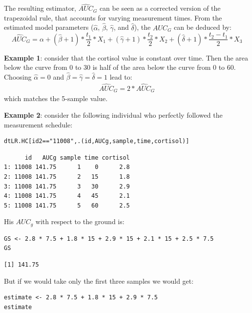 \documentclass[12pt]{article}
\begin{document}
\bigskip

The resulting estimator, \(\widehat{AUC}_G\) can be seen as a
corrected version of the trapezoidal rule, that accounts for varying
measurement times. From the estimated model parameters
(\(\widehat{\alpha}\), \(\widehat{\beta}\), \(\widehat{\gamma}\),
and \(\widehat{\delta}\)), the \(AUC_G\) can be deduced by:
\[ \widehat{AUC}_G = \alpha + (\widehat{\beta}+1) * \frac{t_1}{2} * X_1 + (\widehat{\gamma}+1) * \frac{t_2}{2} * X_2 + (\widehat{\delta}+1) * \frac{t_2-t_1}{2} * X_3\]

\clearpage

\textbf{Example 1}: consider that the cortisol value is constant over
time. Then the area below the curve from 0 to 30 is half of the area
below the curve from 0 to 60. Choosing \(\widehat{\alpha}=0\) and
\(\widehat{\beta}=\widehat{\gamma}=\widehat{\delta}=1\) lead to:
\begin{align*}
\widehat{AUC}_G = 2 * \widehat{AUC}_G
\end{align*}
which matches the 5-sample value.

\bigskip

\textbf{Example 2}: consider the following individual who perfectly followed
 the measurement schedule:
\lstset{language=r,label= ,caption= ,captionpos=b,numbers=none}
\begin{lstlisting}
dtLR.HC[id2=="11008",.(id,AUCg,sample,time,cortisol)]
\end{lstlisting}

\begin{verbatim}
      id   AUCg sample time cortisol
1: 11008 141.75      1    0      2.8
2: 11008 141.75      2   15      1.8
3: 11008 141.75      3   30      2.9
4: 11008 141.75      4   45      2.1
5: 11008 141.75      5   60      2.5
\end{verbatim}


His \(AUC_g\) with respect to the ground is:
\lstset{language=r,label= ,caption= ,captionpos=b,numbers=none}
\begin{lstlisting}
GS <- 2.8 * 7.5 + 1.8 * 15 + 2.9 * 15 + 2.1 * 15 + 2.5 * 7.5
GS
\end{lstlisting}

\begin{verbatim}
[1] 141.75
\end{verbatim}


But if we would take only the first three samples we would get:
\lstset{language=r,label= ,caption= ,captionpos=b,numbers=none}
\begin{lstlisting}
estimate <- 2.8 * 7.5 + 1.8 * 15 + 2.9 * 7.5
estimate
\end{lstlisting}
\end{document}
